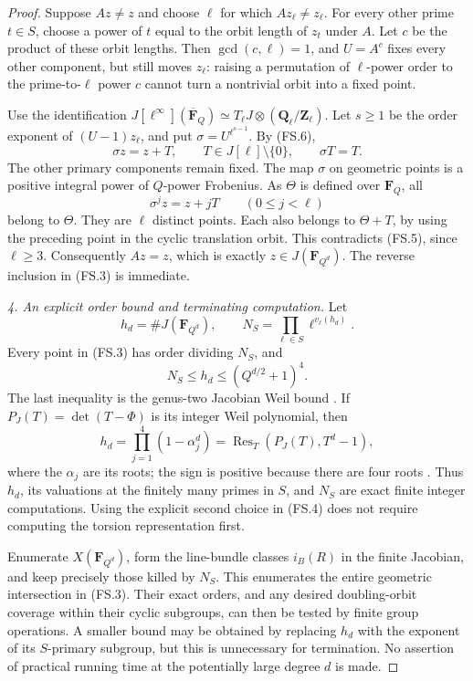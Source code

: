 \documentclass[11pt,a4paper]{article}
\begin{document}
\begin{proof}
Suppose $Az\ne z$ and choose $\ell$ for which
$Az_\ell\ne z_\ell$. For every other prime $t\in S$, choose
a power of $t$ equal to the orbit length of $z_t$ under $A$.
Let $c$ be the product of these orbit lengths. Then
$\gcd(c,\ell)=1$, and $U=A^c$ fixes every other component,
but still moves $z_\ell$: raising a permutation of
$\ell$-power order to the prime-to-$\ell$ power $c$ cannot
turn a nontrivial orbit into a fixed point.

Use the identification
$J[\ell^\infty](\overline{\mathbf F}_Q)
 \simeq T_\ell J\otimes(\mathbf Q_\ell/\mathbf Z_\ell)$.
Let $s\ge1$ be the order exponent of $(U-1)z_\ell$, and put
$\sigma=U^{\ell^{s-1}}$. By (FS.6),
\[
                      \sigma z=z+T,
 \qquad T\in J[\ell]\setminus\{0\},\qquad \sigma T=T.
                                                               \tag{FS.7}
\]
The other primary components remain fixed. The map $\sigma$
on geometric points is a positive integral power of $Q$-power
Frobenius. As $\Theta$ is defined over $\mathbf F_Q$, all
\[
                \sigma^jz=z+jT\qquad(0\le j<\ell)
\]
belong to $\Theta$. They are $\ell$ distinct points. Each also
belongs to $\Theta+T$, by using the preceding point in the
cyclic translation orbit. This contradicts (FS.5), since
$\ell\ge3$. Consequently $Az=z$, which is exactly
$z\in J(\mathbf F_{Q^d})$. The reverse inclusion in (FS.3)
is immediate.

\emph{4. An explicit order bound and terminating computation.}
Let
\[
 h_d=\#J(\mathbf F_{Q^d}),\qquad
 N_S=\prod_{\ell\in S}\ell^{v_\ell(h_d)}.
                                                               \tag{FS.8}
\]
Every point in (FS.3) has order dividing $N_S$, and
\[
                 N_S\le h_d\le(Q^{d/2}+1)^4.                 \tag{FS.9}
\]
The last inequality is the genus-two Jacobian Weil bound
\cite[Theorem~19.1(c)]{MilneAV}.
If $P_J(T)=\det(T-\Phi)$ is its integer Weil polynomial, then
\[
 h_d=\prod_{j=1}^4(1-\alpha_j^d)
       =\operatorname{Res}_T(P_J(T),T^d-1),                 \tag{FS.10}
\]
where the $\alpha_j$ are its roots; the sign is positive
because there are four roots
\cite[Theorem~19.1(b)]{MilneAV}.
Thus $h_d$, its valuations at the finitely many primes in
$S$, and $N_S$ are exact finite integer computations.
Using the explicit second choice in (FS.4) does not require
computing the torsion representation first.

Enumerate $X(\mathbf F_{Q^d})$, form the line-bundle classes
$i_B(R)$ in the finite Jacobian, and keep precisely those killed
by $N_S$. This enumerates the entire geometric intersection
in (FS.3). Their exact orders, and any desired doubling-orbit
coverage within their cyclic subgroups, can then be tested by
finite group operations. A smaller bound may be obtained by
replacing $h_d$ with the exponent of its $S$-primary subgroup,
but this is unnecessary for termination. No assertion of
practical running time at the potentially large degree $d$ is made.
\end{proof}
\end{document}
